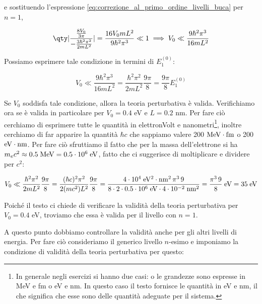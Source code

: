\begin{soluzione}
   e sostituendo l'espressione \eqref{eq:correzione_al_primo_ordine_livelli_buca} per $n=1$,

   \begin{equation*}
      \qty| \frac{ \frac{8V_0}{3\pi} }{ -\frac{3 \hbar^2 \pi^2}{2 m L^2} } |
      =\frac{16 V_0 m L^2}{9 \hbar^2 \pi^3}
      \ll 1
      \implies
      V_0
      \ll \frac{9 \hbar^2 \pi^3}{16 m L^2}
   \end{equation*}

   Possiamo esprimere tale condizione in termini di $E_1^{(0)}$:

   \begin{equation*}
      V_0
      \ll \frac{9 \hbar^2 \pi^3}{16 m L^2}
      =\frac{\hbar^2 \pi^2}{2 m L^2} \frac{9 \pi}{8}
      =\frac{9 \pi}{8} E_1^{(0)}
   \end{equation*}

   Se $V_0$ soddisfa tale condizione, allora la teoria perturbativa è valida. Verifichiamo ora se è valida in particolare per $V_0=0.4$ eV e $L=0.2$ nm. Per fare ciò cerchiamo di esprimere tutte le quantità in elettronVolt e nanometri\footnote{In generale negli esercizi si hanno due casi: o le grandezze sono espresse in MeV e fm o eV e nm. In questo caso il testo fornisce le quantità in eV e nm, il che significa che esse sono delle quantità adeguate per il sistema.}, inoltre cerchiamo di far apparire la quantità $\hbar c$ che sappiamo valere 200 $\rm MeV \cdot fm$ o 200 $\rm eV \cdot nm$. Per fare ciò sfruttiamo il fatto che per la massa dell'elettrone si ha $m_e c^2 \approx 0.5 \; \rm MeV=0.5 \cdot 10^6 \; \rm eV$, fatto che ci suggerisce di moltiplicare e dividere per $c^2$:

   \begin{equation*}
      V_0
      \ll \frac{\hbar^2 \pi^2}{2 m L^2} \frac{9 \pi}{8}
      = \frac{(\hbar c)^2 \pi^2}{2 (m c^2) L^2} \frac{9 \pi}{8}
      =\rm \frac{4 \cdot 10^4 \; eV^2 \cdot nm^2 \, \pi^3 \, 9}{8 \cdot 2 \cdot 0.5 \cdot 10^6 \; eV \cdot 4 \cdot 10^{-2} \; nm^2}
      =\frac{\pi^3 \, 9}{8} \; eV
      =35 \; eV
   \end{equation*}

   Poiché il testo ci chiede di verificare la validità della teoria perturbativa per $V_0=0.4$ eV, troviamo che essa è valida per il livello con $n=1$.
   
   A questo punto dobbiamo controllare la validità anche per gli altri livelli di energia. Per fare ciò consideriamo il generico livello $n$-esimo e imponiamo la condizione di validità della teoria perturbativa per questo:
   

\end{soluzione}
